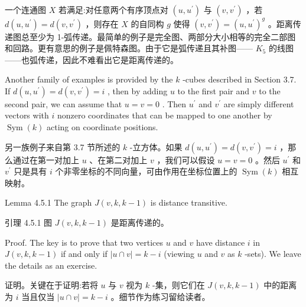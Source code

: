\documentclass[10pt]{article}
\begin{document}
\begin{tcolorbox}\relax
一个连通图 \(X\) 若满足:对任意两个有序顶点对 \(\left( {u,{u}^{\prime }}\right)\) 与 \(\left( {v,{v}^{\prime }}\right)\) ，若 \(d\left( {u,{u}^{\prime }}\right)  = d\left( {v,{v}^{\prime }}\right)\) ，则存在 \(X\) 的自同构 \(g\) 使得 \(\left( {v,{v}^{\prime }}\right)  = {\left( u,{u}^{\prime }\right) }^{g}\) 。距离传递图总至少为 1-弧传递。最简单的例子是完全图、两部分大小相等的完全二部图和回路。更有意思的例子是佩特森图。由于它是弧传递且其补图—— \({K}_{5}\) 的线图——也弧传递，因此不难看出它是距离传递的。
\end{tcolorbox}

Another family of examples is provided by the \(k\) -cubes described in Section 3.7. If \(d\left( {u,{u}^{\prime }}\right)  = d\left( {v,{v}^{\prime }}\right)  = i\) , then by adding \(u\) to the first pair and \(v\) to the second pair, we can assume that \(u = v = 0\) . Then \({u}^{\prime }\) and \({v}^{\prime }\) are simply different vectors with \(i\) nonzero coordinates that can be mapped to one another by \(\operatorname{Sym}\left( k\right)\) acting on coordinate positions.

\begin{tcolorbox}\relax
另一族例子来自第 3.7 节所述的 \(k\) -立方体。如果 \(d\left( {u,{u}^{\prime }}\right)  = d\left( {v,{v}^{\prime }}\right)  = i\) ，那么通过在第一对加上 \(u\) 、在第二对加上 \(v\) ，我们可以假设 \(u = v = 0\) 。然后 \({u}^{\prime }\) 和 \({v}^{\prime }\) 只是具有 \(i\) 个非零坐标的不同向量，可由作用在坐标位置上的 \(\operatorname{Sym}\left( k\right)\) 相互映射。
\end{tcolorbox}

Lemma 4.5.1 The graph \(J\left( {v,k,k - 1}\right)\) is distance transitive.

\begin{tcolorbox}\relax
引理 4.5.1 图 \(J\left( {v,k,k - 1}\right)\) 是距离传递的。
\end{tcolorbox}

Proof. The key is to prove that two vertices \(u\) and \(v\) have distance \(i\) in \(J\left( {v,k,k - 1}\right)\) if and only if \(\left| {u \cap  v}\right|  = k - i\) (viewing \(u\) and \(v\) as \(k\) -sets). We leave the details as an exercise.

\begin{tcolorbox}\relax
证明。关键在于证明:若将 \(u\) 与 \(v\) 视为 \(k\) -集，则它们在 \(J\left( {v,k,k - 1}\right)\) 中的距离为 \(i\) 当且仅当 \(\left| {u \cap  v}\right|  = k - i\) 。细节作为练习留给读者。
\end{tcolorbox}
\end{document}
